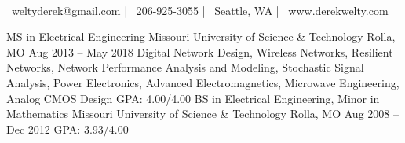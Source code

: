 \documentclass[]{awesome-cv}
\begin{document}
    
\begin{center}
	  \\
	\vspace{2mm}
	{\faEnvelope\ weltyderek@gmail.com} | {\faMobile\ 206-925-3055} | {\faMapMarker\ Seattle, WA} | {\faGlobe\ www.derekwelty.com}
\end{center}
\begin{cventries}
	\cventry
	{MS in Electrical Engineering}
	{Missouri University of Science \& Technology}
	{Rolla, MO}
	{Aug 2013 – May 2018}
	{Digital Network Design, Wireless Networks, Resilient Networks, Network Performance Analysis and Modeling, \newline Stochastic Signal Analysis, Power Electronics, Advanced Electromagnetics, Microwave Engineering, Analog CMOS Design
	\newline
	GPA: 4.00/4.00}
	\cventry
	{BS in Electrical Engineering, Minor in Mathematics}
	{Missouri University of Science \& Technology}
	{Rolla, MO}
	{Aug 2008 – Dec 2012}
	{GPA: 3.93/4.00}
\end{cventries}
\end{document}
